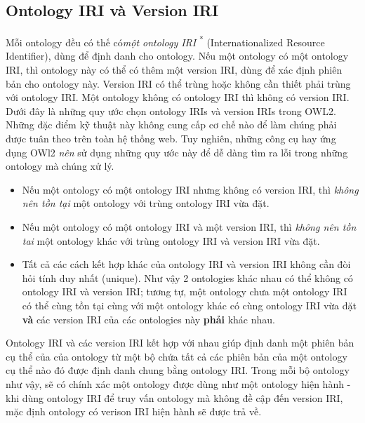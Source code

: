 \subsection{Ontology IRI và Version IRI}
Mỗi ontology đều có thế có\textit{một ontology IRI} \cite{iri} \textsuperscript{*} (Internationalized Resource Identifier), dùng để định danh cho ontology. Nếu một ontology có một ontology IRI, thì ontology này có thể có thêm một version IRI, dùng để xác định phiên bản cho ontology này. Version IRI có thể trùng hoặc không cần thiết phải trùng với ontology IRI. Một ontology không có ontology IRI thì không có version IRI.
Dưới đây là những quy ước chọn ontology IRIs và version IRIs trong OWL2. Những đặc điểm kỹ thuật này không cung cấp cơ chế nào để làm chúng phải được tuân theo trên toàn hệ thống web. Tuy nghiên, những công cụ hay ứng dụng OWl2 \textit{nên} sử dụng những quy ước này để dễ dàng tìm ra lỗi trong những ontology mà chúng xử lý.
{\let\thefootnote\relax{}
}
\begin{itemize}
\item Nếu một ontology có một ontology IRI nhưng không có version IRI, thì \textit{không nên tồn tại} một ontology với trùng ontology IRI vừa đặt.
\item Nếu một ontology có một ontology IRI và một version IRI, thì \textit{không nên tồn tai} một ontology khác với trùng ontology IRI và version IRI vừa đặt.
\item Tất cả các cách kết hợp khác của ontology IRI và version IRI không cần đòi hỏi tính duy nhất (unique). Như vậy 2 ontologies khác nhau có thể không có ontology IRI và version IRI; tương tự, một ontology chưa một ontology IRI có thể cùng tồn tại cùng với một ontology khác có cùng ontology IRI vừa đặt \textbf{và} các version IRI của các ontologies này \textbf{phải} khác nhau.
\end{itemize}
Ontology IRI và các version IRI kết hợp với nhau giúp định danh một phiên bản cụ thể của của ontology từ một bộ chứa tất cả các phiên bản của một ontology cụ thể nào đó được định danh chung bằng ontology IRI. Trong mỗi bộ ontology như vậy, sẽ có chính xác một ontology được dùng như một ontology hiện hành - khi dùng ontology IRI để truy vấn ontology mà không đề cập đến version IRI, mặc định ontology có verison IRI hiện hành sẽ được trả về.




